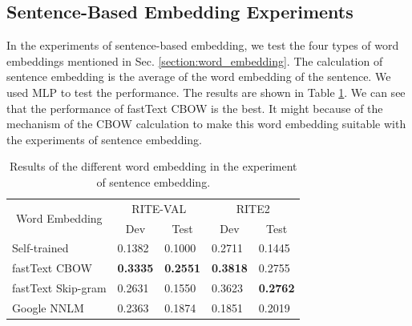 \documentclass[12pt]{article}
\begin{document}
\begin{CJK*}{UTF8}{bkai}
\begin{spacing}{1.77}

\subsection{Sentence-Based Embedding Experiments}
In the experiments of sentence-based embedding, we test the four types of word embeddings mentioned in Sec. \ref{section:word_embedding}. The calculation of sentence embedding is the average of the word embedding of the sentence. We used MLP to test the performance. The results are shown in Table \ref{result:sent_emb_nnlm}. We can see that the performance of fastText CBOW is the best. It might because of the mechanism of the CBOW calculation to make this word embedding suitable with the experiments of sentence embedding.

\begin{table}[H]
  \centering
  \setlength{\extrarowheight}{-3pt}
  \caption{Results of the different word embedding in the experiment of sentence embedding.}
  \label{result:sent_emb_nnlm}
  \begin{tabular}{|l|l|l|l|l|}
  \hline
  \multicolumn{1}{|c|}{\multirow{2}{*}{Word   Embedding}} & \multicolumn{2}{c|}{RITE-VAL} & \multicolumn{2}{c|}{RITE2} \\ \cline{2-5}
  \multicolumn{1}{|c|}{} & \multicolumn{1}{c|}{Dev} & \multicolumn{1}{c|}{Test} & \multicolumn{1}{c|}{Dev} & \multicolumn{1}{c|}{Test} \\ \hline
  Self-trained & 0.1382 & 0.1000 & 0.2711 & 0.1445 \\ \hline
  fastText CBOW & \textbf{0.3335} & \textbf{0.2551} & \textbf{0.3818} & 0.2755 \\ \hline
  fastText Skip-gram & 0.2631 & 0.1550 & 0.3623 & \textbf{0.2762} \\ \hline
  Google NNLM & 0.2363 & 0.1874 & 0.1851 & 0.2019 \\ \hline
  \end{tabular}
\end{table}


\end{spacing}
\end{CJK*}
\end{document}
